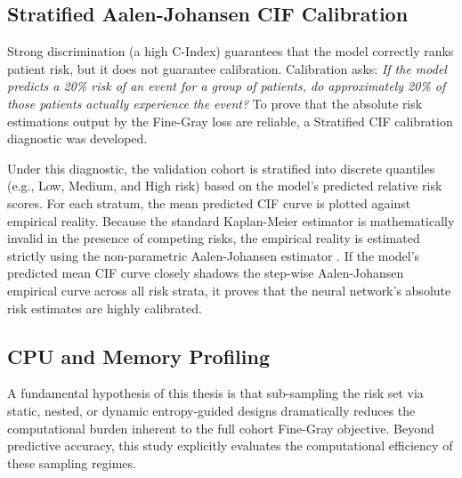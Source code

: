 \documentclass[a4paper,twoside,12pt]{report}
\begin{document}

\subsection{Stratified Aalen-Johansen CIF Calibration}
Strong discrimination (a high C-Index) guarantees that the model correctly ranks patient risk, but it does not guarantee calibration. Calibration asks: \textit{If the model predicts a 20\% risk of an event for a group of patients, do approximately 20\% of those patients actually experience the event?} To prove that the absolute risk estimations output by the Fine-Gray loss are reliable, a Stratified CIF calibration diagnostic was developed.

Under this diagnostic, the validation cohort is stratified into discrete quantiles (e.g., Low, Medium, and High risk) based on the model's predicted relative risk scores. For each stratum, the mean predicted CIF curve is plotted against empirical reality. Because the standard Kaplan-Meier estimator is mathematically invalid in the presence of competing risks, the empirical reality is estimated strictly using the non-parametric Aalen-Johansen estimator \citep{aalen1978empirical}. If the model's predicted mean CIF curve closely shadows the step-wise Aalen-Johansen empirical curve across all risk strata, it proves that the neural network's absolute risk estimates are highly calibrated.

\subsection{CPU and Memory Profiling}
A fundamental hypothesis of this thesis is that sub-sampling the risk set via static, nested, or dynamic entropy-guided designs dramatically reduces the computational burden inherent to the full cohort Fine-Gray objective. Beyond predictive accuracy, this study explicitly evaluates the computational efficiency of these sampling regimes.
\end{document}
